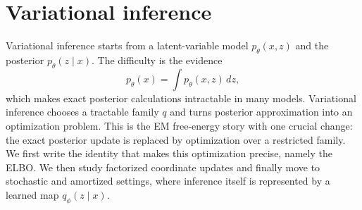 \section{Variational inference}
\label{sec:variational-inference}

Variational inference starts from a latent-variable model \(p_\theta(x,z)\) and the posterior \(p_\theta(z\mid x)\).
The difficulty is the evidence
\[
  p_\theta(x)=\int p_\theta(x,z)\,dz,
\]
which makes exact posterior calculations intractable in many models.
Variational inference chooses a tractable family \(q\) and turns posterior approximation into an optimization problem.
This is the EM free-energy story with one crucial change: the exact posterior update is replaced by optimization over a restricted family.
We first write the identity that makes this optimization precise, namely the ELBO.
We then study factorized coordinate updates and finally move to stochastic and amortized settings, where inference itself is represented by a learned map \(q_\phi(z\mid x)\).




